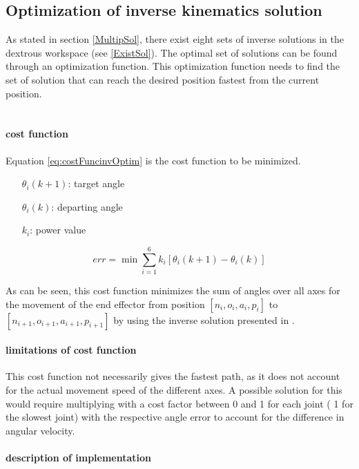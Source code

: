 \subsection{Optimization of inverse kinematics solution}

As stated in section \ref{MultipSol}, there exist eight sets of inverse solutions in the dextrous workspace (see \ref{ExistSol}).
The optimal set of solutions can be found through an optimization function. 
This optimization function needs to find the set of solution that can reach the desired position fastest from the current position.\\
\\
\paragraph{cost function}
Equation \ref{eq:costFuncinvOptim} is the cost function to be minimized.
\begin{itemize}[wide=\parindent] 
	\item[$\theta_i (k+1)$:] target angle
	\item[$\theta_i(k)$:] departing angle
	\item[$k_i$:] power value
\end{itemize}

\begin{equation}\label{eq:costFuncinvOptim}
	err =  \min\sum_{i=1}^{6} k_i [\theta_i (k+1) - \theta_i(k)] 
\end{equation}

As can be seen, this cost function minimizes the sum of angles over all axes for the movement of the end effector from position $[n_i,o_i,a_i,p_i ]$ to $[n_{i+1}, o_{i+1}, a_{i+1}, p_{i+1}]$ by using the inverse solution presented in .

\paragraph{limitations of cost function}
This cost function not necessarily gives the fastest path, as it does not account for the actual movement speed of the different axes. 
A possible solution for this would require multiplying with a cost factor between 0 and 1 for each joint ( 1 for the slowest joint) with the respective angle error to account for the difference in angular velocity.



\paragraph{description of implementation}

